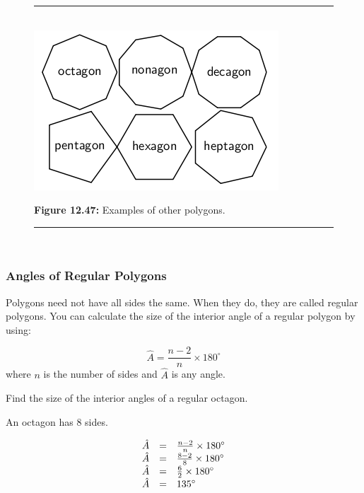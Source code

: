 \par
\setcounter{subfigure}{0}
\begin{figure}[H] %
\begin{center}
\rule[.1in]{\figurerulewidth}{.005in} \\
\label{m39368*uid93!!!underscore!!!media}\label{m39368*uid93!!!underscore!!!printimage}\includegraphics{col11306.imgs/m39368_MG10C13_046.png} %
\vspace{2pt}
\vspace{\rubberspace}\par \begin{cnxcaption}
\small \textbf{Figure 12.47: }Examples of other polygons.
\end{cnxcaption}
\vspace{.1in}
\rule[.1in]{\figurerulewidth}{.005in} \\
\end{center}
\end{figure}       

\subsubsection{ Angles of Regular Polygons}
\nopagebreak
Polygons need not have all sides the same. When they do, they are called regular polygons. You can calculate the size of the interior angle of a regular polygon by using:\par 


\begin{equation*}
\hat{A}=\frac{n-2}{n}\ensuremath{\times}{180}^{\circ }
\end{equation*}
where $n$ is the number of sides and $\hat{A}$ is any angle.
\begin{wex}{}
{

Find the size of the interior angles of a regular octagon.}
{
\westep{}
An octagon has 8 sides.
\westep{}

\begin{equation*}
\begin{array}{ccc}\hfill \hat{A}& =& \frac{n-2}{n}\ensuremath{\times}{180}^{\circ }\hfill \\
 \hfill \hat{A}& =& \frac{8-2}{8}\ensuremath{\times}{180}^{\circ }\hfill \\
 \hfill \hat{A}& =& \frac{6}{2}\ensuremath{\times}{180}^{\circ }\hfill \\
 \hfill \hat{A}& =& {135}^{\circ }\hfill 
\end{array}
\end{equation*}
}
\end{wex}


